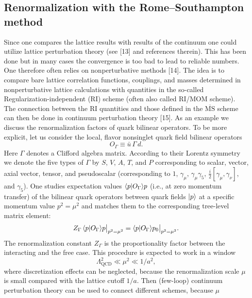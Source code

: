 \subsection{Renormalization with the Rome--Southampton method}
Since one compares the lattice results with results of the continuum one could
utilize lattice perturbation theory (see [13] and references therein). This has
been done but in many cases the convergence is too bad to lead to reliable
numbers. One therefore often relies on nonperturbative methods [14].
The idea is to compare bare lattice correlation functions, couplings, and
masses determined in nonperturbative lattice calculations with quantities
in the so-called Regularization-independent (RI) scheme (often also called
RI/MOM scheme). The connection between the RI quantities and those defined in the $\overline{\mathrm{MS}}$ scheme can then be done in continuum perturbation theory
[15].
As an example we discuss the renormalization factors of quark bilinear
operators. To be more explicit, let us consider the local, flavor nonsinglet
quark field bilinear operators
\begin{equation}
O_\Gamma \equiv \bar{u}\,\Gamma\, d .
\end{equation}
Here $\Gamma$ denotes a Clifford algebra matrix. According to their Lorentz symmetry we denote the five types of $\Gamma$ by $S$, $V$, $A$, $T$, and $P$ corresponding to
scalar, vector, axial vector, tensor, and pseudoscalar (corresponding to $1$, $\gamma_\mu$,
$\gamma_\mu\gamma_5$, $\frac{i}{2}[\gamma_\mu, \gamma_\nu]$, and $\gamma_5$).
One studies expectation values $\langle p|O_\Gamma\rangle{p}$ (i.e., at zero momentum transfer) of the bilinear quark operators between quark fields $|p\rangle$ at a specific momentum value $p^2 = \mu^2$ and matches them to the corresponding tree-level
matrix element:
\begin{equation}
Z_\Gamma\, \langle p|O_\Gamma\rangle{p}\big|_{p^2 = \mu^2} = \langle p|O_\Gamma\rangle{p}_0\big|_{p^2 = \mu^2} .
\end{equation}
The renormalization constant $Z_\Gamma$ is the proportionality factor between the
interacting and the free case.
This procedure is expected to work in a window
\begin{equation}
\Lambda_{\mathrm{QCD}}^2 \ll \mu^2 \ll 1/a^2 ,
\end{equation}
where discretization effects can be neglected, because the renormalization
scale $\mu$ is small compared with the lattice cutoff $1/a$. Then (few-loop) continuum perturbation theory can be used to connect different schemes, because $\mu$
